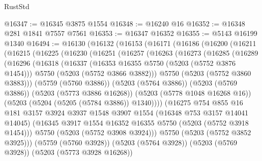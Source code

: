 \begin{lexlean}{RustStd}
\begin{coremodule}
@16347 := @16345 @3875 @1554
@16348 := @16240 @16
@16352 := @16348 @281 @1841 @7557 @7561
@16353 := @16347 @16352
@16355 := @5143 @16199 @1340
@16494 := @16130
    (@16132
      (@16153
        (@16171
          (@16186
            (@16200
              (@16211
                (@16215
                  (@16225
                    (@16230
                      (@16251
                        (@16257
                          (@16263
                            (@16273
                              (@16285
                                (@16289
                                  (@16296
                                    (@16318
                                      (@16337
                                        (@16353 @16355 @5750 (@5203 (@5752 @3876 @1454)))
                                        @5750
                                        (@5203 (@5752 @3866 @3882)))
                                      @5750
                                      (@5203 (@5752 @3860 @3883)))
                                    (@5759 (@5760 @3886))
                                    (@5203 (@5764 @3886))
                                    (@5203 (@5769 @3886))
                                    (@5203 (@5773 @3886 @16268))
                                    (@5203 (@5778 @1048 @16268 @16))
                                    (@5203 (@5204 (@5205 (@5784 @3886)) @1340))))
                                (@16275
                                  @754
                                  @855
                                  @16
                                  @181
                                  @3157
                                  @3924
                                  @3937
                                  @1548
                                  @3907
                                  @1554
                                  (@16348 @753 @3157 @14041 @14045)
                                  (@16345
                                    @3917
                                    @1554
                                    @16352
                                    @16355
                                    @5750
                                    (@5203 (@5752 @3918 @1454)))
                                  @5750
                                  (@5203 (@5752 @3908 @3924)))
                                @5750
                                (@5203 (@5752 @3852 @3925)))
                              (@5759 (@5760 @3928))
                              (@5203 (@5764 @3928))
                              (@5203 (@5769 @3928))
                              (@5203 (@5773 @3928 @16268))

\end{coremodule}
\end{lexlean}

